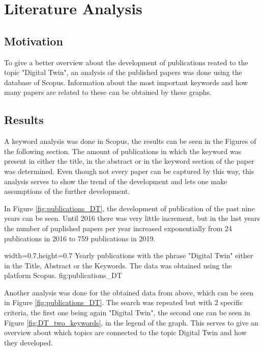   

\section{Literature Analysis}

\subsection{Motivation}  


To give a better overview about the development of publications reated to the topic "Digital Twin", an analysis of the published papers was done using the database of Scopus. 
Information about the most important keywords and how many papers are related to these can be obtained by these graphs. 

\subsection{Results}

A keyword analysis was done in Scopus, the results can be seen in the Figures of the following section. The amount of publications in which the keyword was present in either the title, in the abstract or in the keyword section of the paper was determined. Even though not every paper can be captured by this way, this analysis serves to show the trend of the development and lets one make assumptions of the further development. 

In Figure \ref{fig:publications_DT}, the development of publication of the past nine years can be seen. Until 2016 there was very little increment, but in the last years the number of puplished papers per year increased exponentially from 24 publications in 2016 to 759 publications in 2019. 

  {width=0.7\textwidth,height=0.7\textheight}%
  {Yearly publications with the phrase "Digital Twin" either in the Title, Abstract or the Keywords. The data was obtained using the platform Scopus. }%
  {}%
  {fig:publications_DT}%

Another analysis was done for the obtained data from above, which can be seen in Figure \ref{fig:publications_DT}. The search was repeated but with 2 specific criteria, the first one being again "Digital Twin", the second one can be seen in Figure \ref{fig:DT_two_keywords}, in the legend of the graph. 
This serves to give an overview about which topics are connected to the topic Digital Twin and how they developed. 

